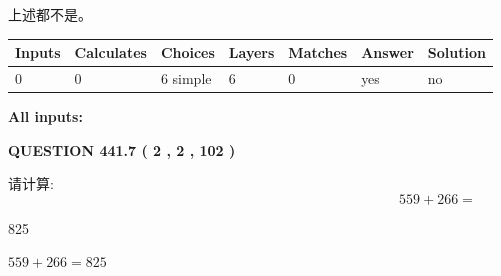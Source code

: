 \documentclass{ctexart}
\begin{document}
 
 上述都不是。
 
 
\noindent{}
 
 
   
   
   
   
\noindent\begin{tabular}{|l|l|l|l|l|l|l|}
 \hline
Inputs & Calculates & Choices & Layers & Matches & Answer & Solution \\ \hline
 0  & 
 0  & 
 6
  simple  
  & 
 6  & 
 0  & 
  yes & 
  no 
  \\ \hline
 \end{tabular}
   
   
   
   
\noindent{}
   
   
   
   
\noindent\vspace{0.1in}\hspace{-0.08in} {\textbf{\Large{All inputs: }}}
   
   
  
\vspace{0.2in}
  
{\textbf{\Large{QUESTION
441.7 
 ( 2 , 2 , 102 )
}}}
  
  
 
请计算:
\begin{equation}
559 +  %
266 = \nonumber
\end{equation}
 
 
 
\noindent{}
 
 

825
 
 
\noindent{}
 
 

 
 
 
\noindent{}
 
 

$ %
559 +  %
266=   %
825$
 
 
\noindent{}
 
\end{document}
